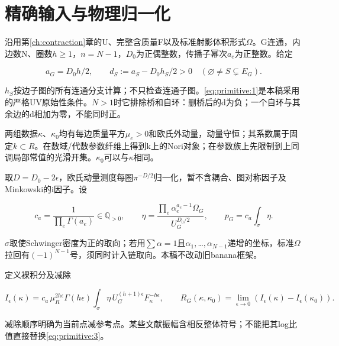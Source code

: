 \documentclass[11pt,a4paper,oneside]{ctexrep}
\theoremstyle{cnplain}
\theoremstyle{definition}
\theoremstyle{remark}
\begin{document}
\section{精确输入与物理归一化}\label{sec:primitive:1}

沿用第\ref{ch:contraction}章的U、完整含质量F以及标准射影体积形式\(\Omega \)。G连通，内边数N、圈数\(h\ge 1\)，\(n=N- 1\)，\(D_0\)为正偶整数，传播子幂次\(a_e\)为正整数。给定

\begin{equation}
a_G=D_0h/2,\qquad
 d_S:=a_S-D_0h_S/2>0\quad(\varnothing\ne S\subsetneq E_G).       \label{eq:primitive:1}
\end{equation}

\(h_S\)按边子图的所有连通分支计算；不只检查连通子图。\eqref{eq:primitive:1}是本稿采用的严格UV原始性条件。\(N>1\)时它排除桥和自环：删桥后的d为负；一个自环与其余边的d相加为零，不能同时正。

两组数据\(\kappa \)、\(\kappa _0\)均有每边质量平方\(\mu _e>0\)和欧氏外动量，动量守恒；其系数属于固定\(k\subset R\)。在数域/代数参数纤维上得到k上的Nori对象；在参数族上先限制到上同调局部常值的光滑开集。\(\kappa _0\)可以与\(\kappa \)相同。

取\(D=D_0- 2\epsilon \)，欧氏动量测度每圈\(\pi ^{- D/2}\)归一化，暂不含耦合、图对称因子及Minkowski的i因子。设

\begin{equation}
c_a=\frac1{\prod_e\Gamma(a_e)}\in\mathbb Q_{>0},\qquad
 \eta=\frac{\prod_e\alpha_e^{a_e-1}\Omega_G}{U_G^{D_0/2}},\qquad
 p_G=c_a\int_\sigma\eta.                                        \label{eq:primitive:2}
\end{equation}

\(\sigma \)取使Schwinger密度为正的取向；若用\(\sum \alpha =1\)且\(\alpha _1,\)\ldots{}\(,\alpha _{N- 1}\)递增的坐标，标准\(\Omega \)拉回有\((- 1)^{N- 1}\)号，须同时计入链取向。本稿不改动旧banana框架。

定义裸积分及减除

\begin{equation}
I_\epsilon(\kappa)=c_a\,\mu_R^{2h\epsilon}\Gamma(h\epsilon)
 \int_\sigma\eta\,U_G^{(h+1)\epsilon}F_\kappa^{-h\epsilon},\qquad
 R_G(\kappa,\kappa_0)=\lim_{\epsilon\to0}
                   (I_\epsilon(\kappa)-I_\epsilon(\kappa_0)).      \label{eq:primitive:3}
\end{equation}

减除顺序明确为当前点减参考点。某些文献振幅含相反整体符号；不能把其log比值直接替换\eqref{eq:primitive:3}。
\end{document}
